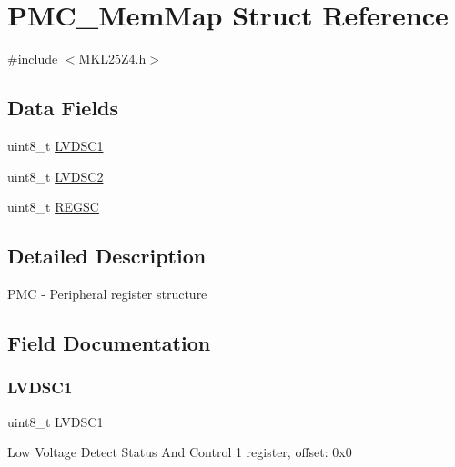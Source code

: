 \hypertarget{struct_p_m_c___mem_map}{}\section{P\+M\+C\+\_\+\+Mem\+Map Struct Reference}
\label{struct_p_m_c___mem_map}


{\ttfamily \#include $<$M\+K\+L25\+Z4.\+h$>$}

\subsection*{Data Fields}
\begin{DoxyCompactItemize}
\item 
uint8\+\_\+t \hyperlink{struct_p_m_c___mem_map_a6f2f8cc9aa750a607962dfba64acf50e}{L\+V\+D\+S\+C1}
\item 
uint8\+\_\+t \hyperlink{struct_p_m_c___mem_map_a63e1dd6700199a875c987cca4676b084}{L\+V\+D\+S\+C2}
\item 
uint8\+\_\+t \hyperlink{struct_p_m_c___mem_map_a9786fdb50c1bad04aedb8b090e2eaddf}{R\+E\+G\+SC}
\end{DoxyCompactItemize}


\subsection{Detailed Description}
P\+MC -\/ Peripheral register structure 

\subsection{Field Documentation}
\mbox{\label{struct_p_m_c___mem_map_a6f2f8cc9aa750a607962dfba64acf50e}} 
\subsubsection{\texorpdfstring{L\+V\+D\+S\+C1}{LVDSC1}}
{\footnotesize\ttfamily uint8\+\_\+t L\+V\+D\+S\+C1}

Low Voltage Detect Status And Control 1 register, offset\+: 0x0 \mbox{\label{struct_p_m_c___mem_map_a63e1dd6700199a875c987cca4676b084}} 
